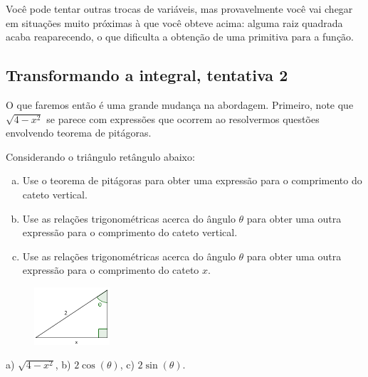 \documentclass[main_estudante.tex]{subfiles}
\begin{document}
Você pode tentar outras trocas de variáveis, mas provavelmente você vai chegar em situações muito próximas à que você obteve acima: alguma raiz quadrada acaba reaparecendo, o que dificulta a obtenção de uma primitiva para a função.

\subsection*{Transformando a integral, tentativa 2}

O que faremos então é uma grande mudança na abordagem. Primeiro, note que $\sqrt{4-x^2}$ se parece com expressões que ocorrem ao resolvermos questões envolvendo teorema de pitágoras.


\begin{questao}
Considerando o triângulo retângulo abaixo:
\begin{enumerate}[a)]
\item Use o teorema de pitágoras para obter uma expressão para o comprimento do cateto vertical.
\item Use as relações trigonométricas acerca do ângulo $\theta$ para obter uma outra expressão para o comprimento do cateto vertical.
\item Use as relações trigonométricas acerca do ângulo $\theta$ para obter uma outra expressão para o comprimento do cateto $x$.
\end{enumerate}
\end{questao}

\begin{figure}[h]
\centering
\includegraphics[width=0.25\textwidth]{./img/l2q4.png}
\end{figure}

\begin{gabarito}
	\begin{gabaritoQuestao}
		a) $\sqrt{4-x^2}$, b) $2\cos(\theta)$, c) $2\sin(\theta)$.
	\end{gabaritoQuestao}
\end{gabarito}
\end{document}
